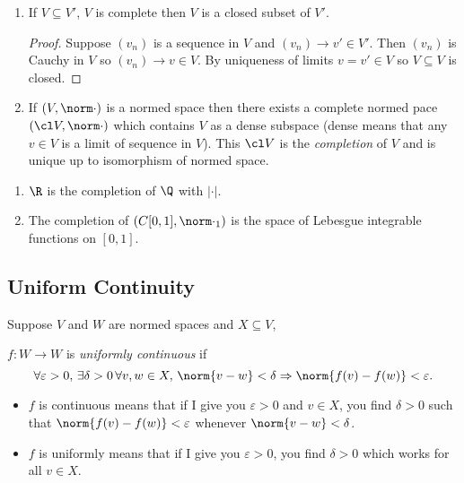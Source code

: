 \documentclass[a4paper]{article}
\theoremstyle{definition}
\begin{document}
\begin{remark}\leavevmode
  \begin{enumerate}
  \item If \(V \subseteq V'\), \(V\) is complete then \(V\) is a closed subset of \(V'\).
    \begin{proof}
      Suppose \((v_n)\) is a sequence in \(V\) and \((v_n) \to v' \in V'\). Then \((v_n)\) is Cauchy in \(V\) so \((v_n) \to v \in V\). By uniqueness of limits \(v = v' \in V\) so \(V \subseteq V\) is closed.
    \end{proof}
  \item If \((V, \norm \cdot)\) is a normed space then there exists a complete normed pace \((\cl V, \norm \cdot)\) which contains \(V\) as a dense subspace (dense means that any \(v \in V\) is a limit of sequence in \(V\)). This \(\cl V\) is the \emph{completion} of \(V\) and is unique up to isomorphism of normed space.
  \end{enumerate}
\end{remark}

\begin{eg}\leavevmode
  \begin{enumerate}
  \item \(\R\) is the completion of \(\Q\) with \(|\cdot|\).
  \item The completion of \((C[0, 1], \norm \cdot_1)\) is the space of Lebesgue integrable functions on \([0, 1]\).
    \end{enumerate}
\end{eg}

\subsection{Uniform Continuity}

Suppose \(V\) and \(W\) are normed spaces and \(X \subseteq V\),

\begin{definition}
  \(f: W \to W\) is \emph{uniformly continuous} if
  \[
    \forall \varepsilon>0, \, \exists \delta>0 \, \forall v, w \in X, \, \norm{v - w} < \delta \Rightarrow \norm{f(v) - f(w)} < \varepsilon.
  \]
\end{definition}

\begin{note}\leavevmode
  \begin{itemize}
  \item \(f\) is continuous means that if I give you \(\varepsilon > 0\) and \(v \in X\), you find \(\delta > 0\) such that \(\norm{f(v) - f(w)} < \varepsilon\) whenever \(\norm{v - w} < \delta\).
  \item \(f\) is uniformly means that if I give you \(\varepsilon > 0\), you find \(\delta > 0\) which works for all \(v \in X\).
  \end{itemize}
\end{note}
\end{document}
